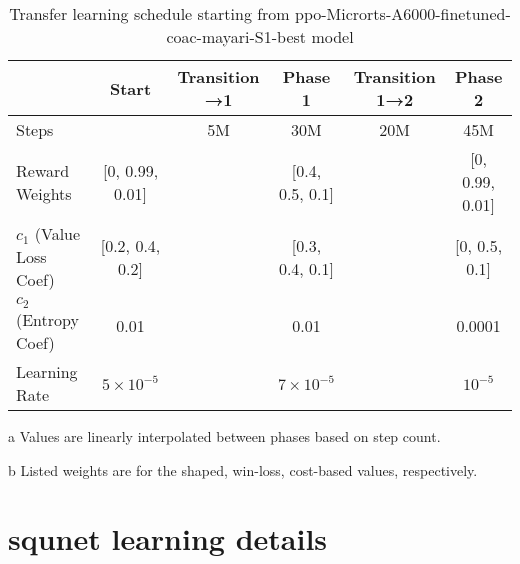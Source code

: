 \documentclass[conference,onecolumn]{IEEEtran}
\newcounter{supptable}
\newenvironment{supptable}
  {\renewcommand{\tablename}{Supplemental Table}\setcounter{table}{\value{supptable}}\addtocounter{supptable}{1}\begin{table}}
  {\end{table}\setcounter{supptable}{\value{table}}}
\begin{document}
\begin{supptable}[H]
    \centering
    \begin{threeparttable}
    \caption{Transfer learning schedule starting from ppo-Microrts-A6000-finetuned-coac-mayari-S1-best model}
    \label{tab:transfer-learning-schedule}
    \begin{tabular}{lccccc}
    \toprule
     & Start & Transition →1\tnote{a} & Phase 1 & Transition 1→2\tnote{a} & Phase 2 \\
     \midrule
    Steps & & 5M & 30M & 20M & 45M \\
    Reward Weights\tnote{b} & [0, 0.99, 0.01] & & [0.4, 0.5, 0.1] & & [0, 0.99, 0.01] \\
    $c_1$ (Value Loss Coef)\tnote{b} & [0.2, 0.4, 0.2] & & [0.3, 0.4, 0.1] & & [0, 0.5, 0.1]\\
    $c_2$ (Entropy Coef) & 0.01 & & 0.01 & & 0.0001 \\
    Learning Rate & $5 \times 10^{-5}$ & & $7 \times 10^{-5}$ & & $10^{-5}$ \\
    \bottomrule
    \end{tabular}
    \begin{tablenotes}
       \item[a] Values are linearly interpolated between phases based on step count.
       \item[b] Listed weights are for the shaped, win-loss, cost-based values, respectively.
    \end{tablenotes}
    \end{threeparttable}
\end{supptable}

\section{squnet learning details}
\label{appendix:squnet-learning-details}
\end{document}

